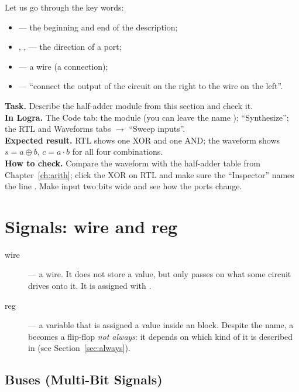 Let us go through the key words:
\begin{itemize}
  \item {} --- the beginning and end of the description;
  \item {}, ,  --- the direction of a port;
  \item {} --- a wire (a connection);
  \item {} --- ``connect the output of the circuit on the right to the wire on the left''.
\end{itemize}

\begin{diybox}
\textbf{Task.} Describe the half-adder module from this section and check it.\\
\textbf{In Logra.} The Code tab: the  module (you can leave the name ); ``Synthesize''; the RTL and Waveforms tabs $\to$ ``Sweep inputs''.\\
\textbf{Expected result.} RTL shows one XOR and one AND; the waveform shows $s=a\oplus b$, $c=a\cdot b$ for all four combinations.\\
\textbf{How to check.} Compare the waveform with the half-adder table from Chapter~\ref{ch:arith}; click the XOR on RTL and make sure the ``Inspector'' names the line .  Make input  two bits wide and see how the ports change.
\end{diybox}

\section{Signals: wire and reg}

\begin{description}
  \item[wire] --- a wire. It does not store a value, but only passes on what some circuit
    drives onto it. It is assigned with .
  \item[reg] --- a variable that is assigned a value inside an 
    block. Despite the name, a  becomes a flip-flop
    \emph{not always}: it depends on which kind of  it is described in (see
    Section~\ref{sec:always}).
\end{description}

\subsection{Buses (Multi-Bit Signals)}

